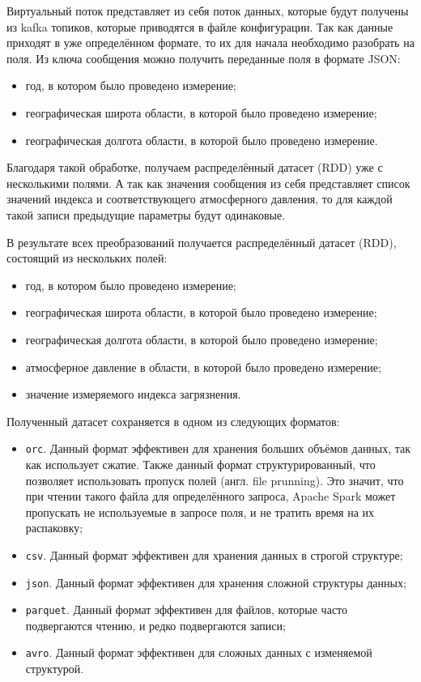 Виртуальный поток представляет из себя поток данных, которые будут получены из kafka топиков, которые приводятся в файле конфигурации.
Так как данные приходят в уже определённом формате, то их для начала необходимо разобрать на поля.
Из ключа сообщения можно получить переданные поля в формате JSON:
\begin{itemize}
    \item год, в котором было проведено измерение;
    \item географическая широта области, в которой было проведено измерение;
    \item географическая долгота области, в которой было проведено измерение.
\end{itemize}

Благодаря такой обработке, получаем распределённый датасет (RDD) уже с несколькими полями.
А так как значения сообщения из себя представляет список значений индекса и соответствующего атмосферного давления, то для каждой такой записи предыдущие параметры будут одинаковые.

В результате всех преобразований получается распределённый датасет (RDD), состоящий из нескольких полей:
\begin{itemize}
    \item год, в котором было проведено измерение;
    \item географическая широта области, в которой было проведено измерение;
    \item географическая долгота области, в которой было проведено измерение;
    \item атмосферное давление в области, в которой было проведено измерение;
    \item значение измеряемого индекса загрязнения.
\end{itemize}

Полученный датасет сохраняется в одном из следующих форматов:
\begin{itemize}
    \item \texttt{orc}. Данный формат эффективен для хранения больших объёмов данных, так как использует сжатие. Также данный формат структурированный, что позволяет использовать пропуск полей (англ. file prunning). Это значит, что при чтении такого файла для определённого запроса, Apache Spark может пропускать не используемые в запросе поля, и не тратить время на их распаковку;
    \item \texttt{csv}. Данный формат эффективен для хранения данных в строгой структуре;
    \item \texttt{json}. Данный формат эффективен для хранения сложной структуры данных;
    \item \texttt{parquet}. Данный формат эффективен для файлов, которые часто подвергаются чтению, и редко подвергаются записи;
    \item \texttt{avro}. Данный формат эффективен для сложных данных с изменяемой структурой.
\end{itemize}

